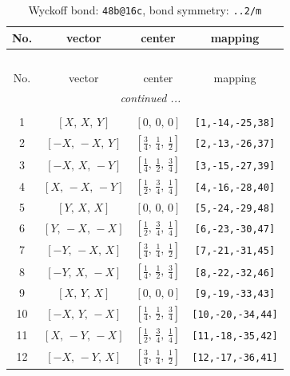 \documentclass[fleqn,8pt]{jsarticle}
\begin{document}
\begin{longtable}{cccc}
\caption{Wyckoff bond: {\tt 48b@16c}, bond symmetry: {\tt ..2/m}}
 \\
 \hline \hline
No. & vector & center & mapping \\ \hline \endfirsthead

\multicolumn{3}{l}{\tablename\ \thetable{}} \\
 \hline \hline
No. & vector & center & mapping \\ \hline \endhead

 \hline \hline
\multicolumn{3}{r}{\footnotesize\it continued ...} \\ \endfoot

 \hline \hline
\multicolumn{3}{r}{} \\ \endlastfoot

1 & $\left[ X,\, X,\, Y \right]$ & $\left[ 0,\, 0,\, 0 \right]$ & {\tt [1,-14,-25,38]} \\ \hline
2 & $\left[ - X,\, - X,\, Y \right]$ & $\left[ \frac{3}{4},\, \frac{1}{4},\, \frac{1}{2} \right]$ & {\tt [2,-13,-26,37]} \\ \hline
3 & $\left[ - X,\, X,\, - Y \right]$ & $\left[ \frac{1}{4},\, \frac{1}{2},\, \frac{3}{4} \right]$ & {\tt [3,-15,-27,39]} \\ \hline
4 & $\left[ X,\, - X,\, - Y \right]$ & $\left[ \frac{1}{2},\, \frac{3}{4},\, \frac{1}{4} \right]$ & {\tt [4,-16,-28,40]} \\ \hline
5 & $\left[ Y,\, X,\, X \right]$ & $\left[ 0,\, 0,\, 0 \right]$ & {\tt [5,-24,-29,48]} \\ \hline
6 & $\left[ Y,\, - X,\, - X \right]$ & $\left[ \frac{1}{2},\, \frac{3}{4},\, \frac{1}{4} \right]$ & {\tt [6,-23,-30,47]} \\ \hline
7 & $\left[ - Y,\, - X,\, X \right]$ & $\left[ \frac{3}{4},\, \frac{1}{4},\, \frac{1}{2} \right]$ & {\tt [7,-21,-31,45]} \\ \hline
8 & $\left[ - Y,\, X,\, - X \right]$ & $\left[ \frac{1}{4},\, \frac{1}{2},\, \frac{3}{4} \right]$ & {\tt [8,-22,-32,46]} \\ \hline
9 & $\left[ X,\, Y,\, X \right]$ & $\left[ 0,\, 0,\, 0 \right]$ & {\tt [9,-19,-33,43]} \\ \hline
10 & $\left[ - X,\, Y,\, - X \right]$ & $\left[ \frac{1}{4},\, \frac{1}{2},\, \frac{3}{4} \right]$ & {\tt [10,-20,-34,44]} \\ \hline
11 & $\left[ X,\, - Y,\, - X \right]$ & $\left[ \frac{1}{2},\, \frac{3}{4},\, \frac{1}{4} \right]$ & {\tt [11,-18,-35,42]} \\ \hline
12 & $\left[ - X,\, - Y,\, X \right]$ & $\left[ \frac{3}{4},\, \frac{1}{4},\, \frac{1}{2} \right]$ & {\tt [12,-17,-36,41]} \\
\end{longtable}
\end{document}
